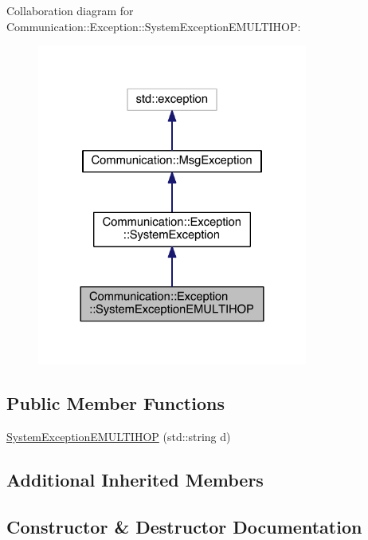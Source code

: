 Collaboration diagram for Communication\+:\+:Exception\+:\+:System\+Exception\+E\+M\+U\+L\+T\+I\+H\+O\+P\+:\nopagebreak
\begin{figure}[H]
\begin{center}
\leavevmode
\includegraphics[width=252pt]{class_communication_1_1_exception_1_1_system_exception_e_m_u_l_t_i_h_o_p__coll__graph}
\end{center}
\end{figure}
\subsection*{Public Member Functions}
\begin{DoxyCompactItemize}
\item 
\hyperlink{class_communication_1_1_exception_1_1_system_exception_e_m_u_l_t_i_h_o_p_a7d1d8bac05acc230d1e411ec2854bb48}{System\+Exception\+E\+M\+U\+L\+T\+I\+H\+O\+P} (std\+::string d)
\end{DoxyCompactItemize}
\subsection*{Additional Inherited Members}


\subsection{Constructor \& Destructor Documentation}
\hypertarget{class_communication_1_1_exception_1_1_system_exception_e_m_u_l_t_i_h_o_p_a7d1d8bac05acc230d1e411ec2854bb48}{}
